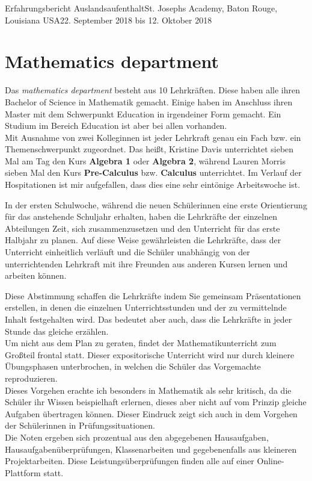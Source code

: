 \documentclass[oneside,openany,headings=optiontotoc,11pt,numbers=noenddot]{article}
\begin{document}
\begin{worksheet}{Erfahrungsbericht Auslandsaufenthalt}{St. Joseph\grq{}s Academy, Baton Rouge, Louisiana USA}{22. September 2018 bis 12. Oktober 2018}
		\section{Mathematics department}
		Das \textit{mathematics department} besteht aus 10 Lehrkräften. Diese haben alle ihren Bachelor of Science in Mathematik gemacht. Einige haben im Anschluss ihren Master mit dem Schwerpunkt Education in irgendeiner Form gemacht. Ein Studium im Bereich Education ist aber bei allen vorhanden.\\
		Mit Ausnahme von zwei Kolleginnen ist jeder Lehrkraft genau ein Fach bzw. ein Themenschwerpunkt zugeordnet. Das heißt, Kristine Davis unterrichtet sieben Mal am Tag den Kurs \textbf{Algebra 1} oder \textbf{Algebra 2}, während Lauren Morris sieben Mal den Kurs \textbf{Pre-Calculus} bzw. \textbf{Calculus} unterrichtet. Im Verlauf der Hospitationen ist mir aufgefallen, dass dies eine sehr eintönige Arbeitswoche ist.
		\par\noindent
		In der ersten Schulwoche, während die neuen Schülerinnen eine erste Orientierung für das anstehende Schuljahr erhalten, haben die Lehrkräfte der einzelnen Abteilungen Zeit, sich zusammenzusetzen und den Unterricht für das erste Halbjahr zu planen. Auf diese Weise gewährleisten die Lehrkräfte, dass der Unterricht einheitlich verläuft und die Schüler unabhängig von der unterrichtenden Lehrkraft mit ihre Freunden aus anderen Kursen lernen und arbeiten können.\\
		\par\noindent
		Diese Abstimmung schaffen die Lehrkräfte indem Sie gemeinsam Präsentationen erstellen, in denen die einzelnen Unterrichtsstunden und der zu vermittelnde Inhalt festgehalten wird. Das bedeutet aber auch, dass die Lehrkräfte in jeder Stunde das gleiche erzählen.\\
		Um nicht aus dem Plan zu geraten, findet der Mathematikunterricht zum Großteil frontal statt. Dieser expositorische Unterricht wird nur durch kleinere \grq{}Übungsphasen\grq{} unterbrochen, in welchen die Schüler das Vorgemachte reproduzieren.\\
		Dieses Vorgehen erachte ich besonders in Mathematik als sehr kritisch, da die Schüler ihr Wissen beispielhaft erlernen, dieses aber nicht auf vom Prinzip gleiche Aufgaben übertragen können. Dieser Eindruck zeigt sich auch in dem Vorgehen der Schülerinnen in Prüfungssituationen.\\
		Die Noten ergeben sich prozentual aus den abgegebenen Hausaufgaben, Hausaufgabenüberprüfungen, Klassenarbeiten und gegebenenfalls aus kleineren Projektarbeiten. Diese Leistungsüberprüfungen finden alle auf einer Online-Plattform statt.

\end{worksheet}
\end{document}
